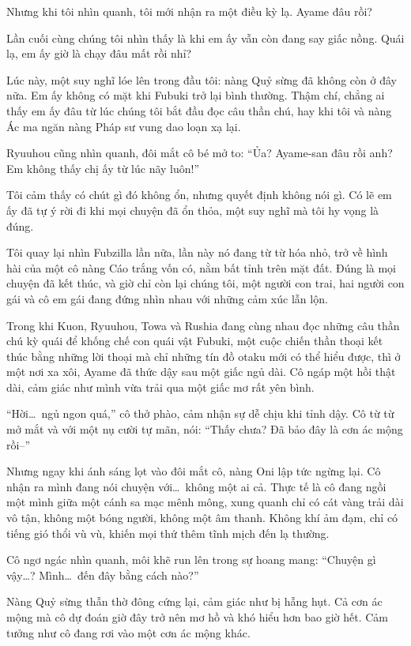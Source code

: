 \documentclass[../main.tex]{subfiles}
\begin{document}
Nhưng khi tôi nhìn quanh, tôi mới nhận ra một điều kỳ lạ. Ayame đâu rồi?

Lần cuối cùng chúng tôi nhìn thấy là khi em ấy vẫn còn đang say giấc nồng. Quái lạ, em ấy giờ là chạy đâu mất rồi nhỉ?

Lúc này, một suy nghĩ lóe lên trong đầu tôi: nàng Quỷ sừng đã không còn ở đây nữa. Em ấy không có mặt khi Fubuki trở lại bình thường. Thậm chí, chẳng ai thấy em ấy đâu từ lúc chúng tôi bắt đầu đọc câu thần chú, hay khi tôi và nàng Ác ma ngăn nàng Pháp sư vung dao loạn xạ lại.

Ryuuhou cũng nhìn quanh, đôi mắt cô bé mở to: ``Ủa? Ayame-san đâu rồi anh? Em không thấy chị ấy từ lúc nãy luôn!''

Tôi cảm thấy có chút gì đó không ổn, nhưng quyết định không nói gì. Có lẽ em ấy đã tự ý rời đi khi mọi chuyện đã ổn thỏa, một suy nghĩ mà tôi hy vọng là đúng.

Tôi quay lại nhìn Fubzilla lần nữa, lần này nó đang từ từ hóa nhỏ, trở về hình hài của một cô nàng Cáo trắng vốn có, nằm bất tỉnh trên mặt đất. Đúng là mọi chuyện đã kết thúc, và giờ chỉ còn lại chúng tôi, một người con trai, hai người con gái và cô em gái đang đứng nhìn nhau với những cảm xúc lẫn lộn.

\pov{-}

Trong khi Kuon, Ryuuhou, Towa và Rushia đang cùng nhau đọc những câu thần chú kỳ quái để khống chế con quái vật Fubuki, một cuộc chiến thần thoại kết thúc bằng những lời thoại mà chỉ những tín đồ otaku mới có thể hiểu được, thì ở một nơi xa xôi, Ayame đã thức dậy sau một giấc ngủ dài. Cô ngáp một hồi thật dài, cảm giác như mình vừa trải qua một giấc mơ rất yên bình.

``Hời\dots\ ngủ ngon quá,'' cô thở phào, cảm nhận sự dễ chịu khi tỉnh dậy. Cô từ từ mở mắt và với một nụ cười tự mãn, nói: ``Thấy chưa? Đã bảo đây là cơn ác mộng rồi--''

Nhưng ngay khi ánh sáng lọt vào đôi mắt cô, nàng Oni lập tức ngừng lại. Cô nhận ra mình đang nói chuyện với\dots\ không một ai cả. Thực tế là cô đang ngồi một mình giữa một cánh sa mạc mênh mông, xung quanh chỉ có cát vàng trải dài vô tận, không một bóng người, không một âm thanh. Không khí ảm đạm, chỉ có tiếng gió thổi vù vù, khiến mọi thứ thêm tĩnh mịch đến lạ thường.


Cô ngơ ngác nhìn quanh, môi khẽ run lên trong sự hoang mang: ``Chuyện gì vậy\dots? Mình\dots\ đến đây bằng cách nào?''

Nàng Quỷ sừng thẫn thờ đông cứng lại, cảm giác như bị hẫng hụt. Cả cơn ác mộng mà cô dự đoán giờ đây trở nên mơ hồ và khó hiểu hơn bao giờ hết. Cảm tưởng như cô đang rơi vào một cơn ác mộng khác.
\end{document}
